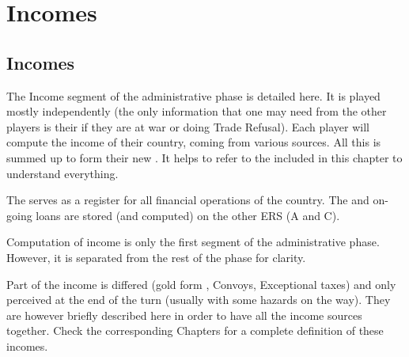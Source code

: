 \chapter{Incomes}\label{chapter:Incomes}
\section{Incomes}
\aparag[Overview]
The Income segment of the administrative phase is detailed here. It is
played mostly independently (the only information that one may need from
the other players is their  if they are at war
or doing Trade Refusal). Each player will compute the income of their
country, coming from various sources.%
All this is summed up to form their new \RT. It helps to refer to the
 included in this chapter to understand
everything.

The  serves as a register for all
financial operations of the country. The \RT and on-going loans are
stored (and computed) on the other ERS (A and C).

Computation of income is only the first segment of the administrative
phase. However, it is separated from the rest of the phase for clarity.

Part of the income is differed (gold form \ROTW, Convoys, Exceptional
taxes) and only perceived at the end of the turn (usually with some
hazards on the way). They are however briefly described here in order to
have all the income sources together. Check the corresponding Chapters
for a complete definition of these incomes.



